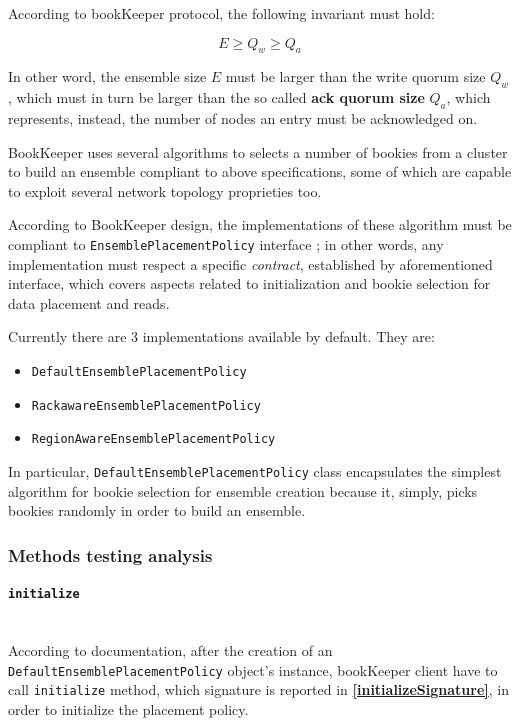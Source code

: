\documentclass[sigconf]{acmart}
\begin{document}
According to bookKeeper protocol\cite{BookKeeperProtocol}, the following invariant must hold:

\begin{equation}
E \geqslant Q_w \geqslant Q_a
\end{equation}

In other word, the ensemble size $E$ must be larger than the write quorum size $Q_w$, which must in turn be larger than the so called \textbf{ack quorum size} $Q_a$, which represents, instead, the number of nodes an entry must be acknowledged on. 

BookKeeper uses several algorithms to selects a number of bookies from a cluster to build an ensemble compliant to above specifications, some of which are capable to exploit several network topology proprieties too. 

According to BookKeeper design, the implementations of these algorithm must be compliant to \texttt{EnsemblePlacementPolicy} interface \cite{EnsemblePlacementPolicy}; in other words, any implementation must respect a specific \textit{contract}, established by aforementioned interface, which covers aspects related to initialization and bookie selection for data placement and reads\cite{EnsemblePlacementPolicy}. 

Currently there are 3 implementations available by default. They are:
\begin{itemize}
\item \texttt{DefaultEnsemblePlacementPolicy}
\item \texttt{RackawareEnsemblePlacementPolicy}
\item \texttt{RegionAwareEnsemblePlacementPolicy}
\end{itemize}

In particular, \texttt{DefaultEnsemblePlacementPolicy} class encapsulates the simplest algorithm for bookie selection for ensemble creation because it, simply, picks bookies randomly in order to build an ensemble. 

\subsubsection{Methods testing analysis}

\paragraph{\texttt{initialize}}
\hfill\\
According to documentation, after the creation of an \texttt{Default\-EnsemblePlacementPolicy} object's instance, bookKeeper client have to call \texttt{initialize} method, which signature is reported in \textbf{\cref{initializeSignature}}, in order to initialize the placement policy. 
\end{document}

